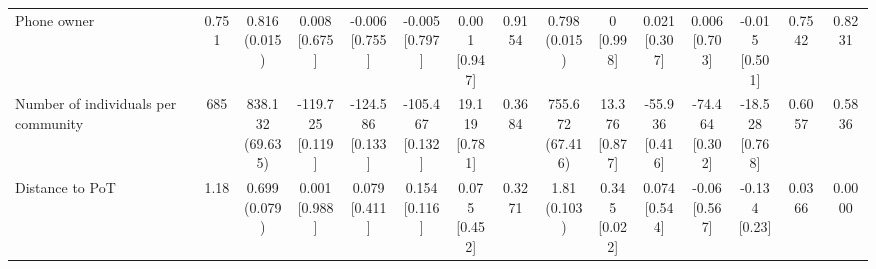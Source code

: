 {\begin{tabular}[t]{lcccccccccccccc}
\hspace{1em}Phone owner & 0.751 & \makecell[c]{0.816\\(0.015)} & \makecell[c]{0.008\\{[0.675]}} & \makecell[c]{-0.006\\{[0.755]}} & \makecell[c]{-0.005\\{[0.797]}} & \makecell[c]{0.001\\{[0.947]}} & 0.9154 & \makecell[c]{0.798\\(0.015)} & \makecell[c]{0\\{[0.998]}} & \makecell[c]{0.021\\{[0.307]}} & \makecell[c]{0.006\\{[0.703]}} & \makecell[c]{-0.015\\{[0.501]}} & 0.7542 & 0.8231\\
\hspace{1em}Number of individuals per community & 685 & \makecell[c]{838.132\\(69.635)} & \makecell[c]{-119.725\\{[0.119]}} & \makecell[c]{-124.586\\{[0.133]}} & \makecell[c]{-105.467\\{[0.132]}} & \makecell[c]{19.119\\{[0.781]}} & 0.3684 & \makecell[c]{755.672\\(67.416)} & \makecell[c]{13.376\\{[0.877]}} & \makecell[c]{-55.936\\{[0.416]}} & \makecell[c]{-74.464\\{[0.302]}} & \makecell[c]{-18.528\\{[0.768]}} & 0.6057 & 0.5836\\
\hspace{1em}Distance to PoT & 1.18 & \makecell[c]{0.699\\(0.079)} & \makecell[c]{0.001\\{[0.988]}} & \makecell[c]{0.079\\{[0.411]}} & \makecell[c]{0.154\\{[0.116]}} & \makecell[c]{0.075\\{[0.452]}} & 0.3271 & \makecell[c]{1.81\\(0.103)} & \makecell[c]{0.345\\{[0.022]}} & \makecell[c]{0.074\\{[0.544]}} & \makecell[c]{-0.06\\{[0.567]}} & \makecell[c]{-0.134\\{[0.23]}} & 0.0366 & 0.0000\\

\end{tabular}}

